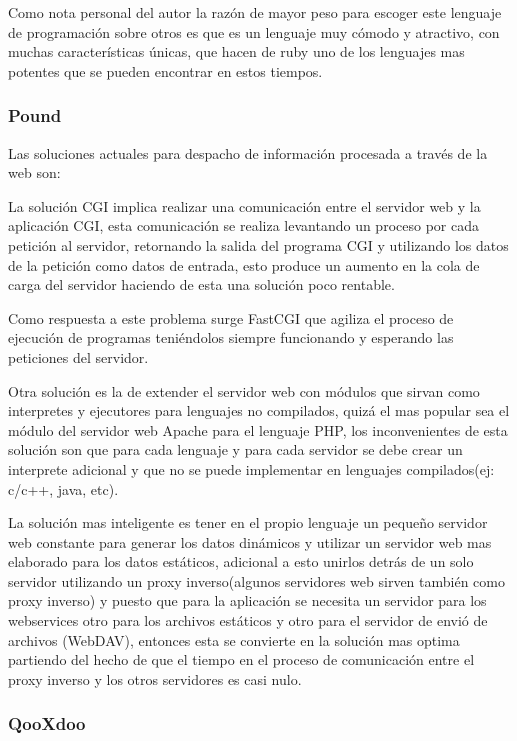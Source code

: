 Como nota personal del autor la razón de mayor peso para escoger este lenguaje de programación sobre otros es que es un lenguaje muy cómodo y atractivo, con muchas características únicas, que hacen de ruby uno de los lenguajes mas potentes que se pueden encontrar en estos tiempos.


\subsubsection*{Pound \cite{pound} }

Las soluciones actuales para despacho de información procesada a través de la web son:

La solución CGI implica realizar una comunicación entre el servidor web y la aplicación CGI, esta comunicación se realiza levantando un proceso por cada petición al servidor, retornando la salida del programa CGI y utilizando los datos de la petición como datos de entrada, esto produce un aumento en la cola de carga del servidor haciendo de esta una solución poco rentable.

Como respuesta a este problema surge FastCGI que agiliza el proceso de ejecución de programas teniéndolos siempre funcionando y esperando las peticiones del servidor.

Otra solución es la de extender el servidor web con módulos que sirvan como interpretes y ejecutores para lenguajes no compilados, quizá el mas popular sea el módulo del servidor web Apache para el lenguaje PHP, los inconvenientes de esta solución son que para cada lenguaje y para cada servidor se debe crear un interprete adicional y que no se puede implementar en lenguajes compilados(ej: c/c++, java, etc).

La solución mas inteligente es tener en el propio lenguaje un pequeño servidor web constante para generar los datos dinámicos y utilizar un servidor web mas elaborado para los datos estáticos, adicional a esto unirlos detrás de un solo servidor utilizando un proxy inverso(algunos servidores web sirven también como proxy inverso) y puesto que para la aplicación se necesita un servidor para los webservices otro para los archivos estáticos y otro para el servidor de envió de archivos (WebDAV), entonces esta se convierte en la solución mas optima partiendo del hecho de que el tiempo en el proceso de comunicación entre el proxy inverso y los otros servidores es casi nulo.


\subsubsection*{QooXdoo \cite{qooxdoo} }


